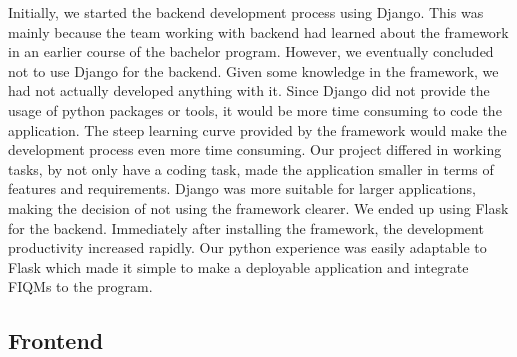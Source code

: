 \begin{table}[h]
\centering
{}
\caption{Pros and cons with Flask}
\end{table}

Initially, we started the backend development process using Django. This was mainly because the team working with backend had learned about the framework in an earlier course of the bachelor program. However, we eventually concluded not to use Django for the backend. Given some knowledge in the framework, we had not actually developed anything with it. Since Django did not provide the usage of python packages or tools, it would be more time consuming to code the application. The steep learning curve provided by the framework would make the development process even more time consuming. Our project differed in working tasks, by not only have a coding task, made the application smaller in terms of features and requirements. Django was more suitable for larger applications, making the decision of not using the framework clearer. We ended up using Flask for the backend. Immediately after installing the framework, the development productivity increased rapidly. Our python experience was easily adaptable to Flask which made it simple to make a deployable application and integrate FIQMs to the program. 

\subsection*{Frontend}

